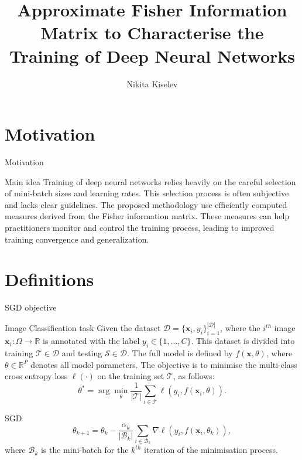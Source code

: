 \documentclass{beamer}
\title[Fisher Matrix Approximation]{Approximate Fisher Information Matrix to Characterise the Training of Deep Neural Networks}
\author{Nikita Kiselev}
\institute{MIPT, 2024}
\begin{document}
\begin{frame}
    \titlepage
\end{frame}


\begin{frame}
    \tableofcontents
\end{frame}


\section{Motivation}
\begin{frame}{Motivation}
    \begin{block}{Main idea}
         Training of deep neural networks relies heavily on the careful selection of mini-batch sizes and learning rates. This selection process is often subjective and lacks clear guidelines. The proposed methodology use efficiently computed measures derived from the Fisher information matrix. These measures can help practitioners monitor and control the training process, leading to improved training convergence and generalization.
    \end{block} 
\end{frame}

\section{Definitions}
\begin{frame}{SGD objective}
    \begin{block}{Image Classification task}
        Given the dataset $\mathcal{D} = \{ \mathbf{x}_i, y_i \}_{i=1}^{|\mathcal{D}|}$, where the $i^{th}$ image $\mathbf{x}_i:\Omega \rightarrow \mathbb R$ is annotated with the label $y_i \in \{1,...,C\}$. This dataset is divided into training $\mathcal{T} \in \mathcal{D}$ and testing $\mathcal{S} \in \mathcal{D}$. The full model is defined by $f(\mathbf{x}, \theta )$, where $\theta \in \mathbb R^P$ denotes all model parameters. The objective is to minimise the multi-class cross entropy loss $\ell ( \cdot )$ on the training set $\mathcal{T}$, as follows:
        \begin{equation}
        \theta^* = \arg \min_{\theta} \frac{1}{|\mathcal{T}|}\sum_{i \in \mathcal{T}} \ell \left ( y_i , f(\mathbf{x}_i, \theta )  \right ).
        \end{equation}
    \end{block}
    \begin{block}{SGD}
        \begin{equation}
        \theta_{k+1} = \theta_{k} -   \frac{\alpha_k}{|\mathcal{B}_k|} \sum_{i \in \mathcal{B}_k} \nabla \ell(y_i,f(\mathbf{x}_i,\theta_k)),
        \label{eq:sgd}
        \end{equation}
        where $\mathcal{B}_k$ is the mini-batch for the $k^{th}$ iteration of the minimisation process.
    \end{block}
\end{frame}
\end{document}
